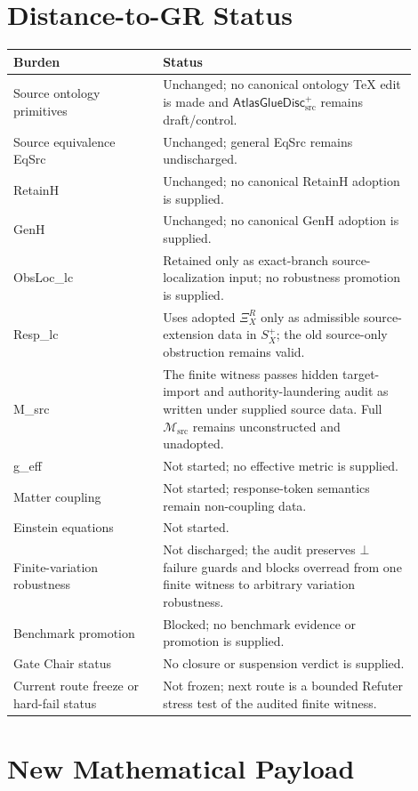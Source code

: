 \documentclass[11pt]{article}
\newcommand{\Msrc}{\mathcal{M}_{\mathrm{src}}}
\newcommand{\XiR}{\Xi_X^R}
\newcommand{\Splus}{S_X^+}
\newcommand{\AtlasGlueDisc}{\mathsf{AtlasGlueDisc}_{\mathrm{src}}^{+}}
\newcommand{\Bot}{\bot}
\begin{document}
\section{Distance-to-GR Status}

\begin{center}
\begin{tabular}{p{0.33\linewidth}p{0.57\linewidth}}
\hline
Burden & Status \\
\hline
Source ontology primitives & Unchanged; no canonical ontology TeX edit is made and \(\AtlasGlueDisc\) remains draft/control. \\
Source equivalence EqSrc & Unchanged; general EqSrc remains undischarged. \\
RetainH & Unchanged; no canonical RetainH adoption is supplied. \\
GenH & Unchanged; no canonical GenH adoption is supplied. \\
ObsLoc\_lc & Retained only as exact-branch source-localization input; no robustness promotion is supplied. \\
Resp\_lc & Uses adopted \(\XiR\) only as admissible source-extension data in \(\Splus\); the old source-only obstruction remains valid. \\
M\_src & The finite witness passes hidden target-import and authority-laundering audit as written under supplied source data. Full \(\Msrc\) remains unconstructed and unadopted. \\
g\_eff & Not started; no effective metric is supplied. \\
Matter coupling & Not started; response-token semantics remain non-coupling data. \\
Einstein equations & Not started. \\
Finite-variation robustness & Not discharged; the audit preserves \(\Bot\) failure guards and blocks overread from one finite witness to arbitrary variation robustness. \\
Benchmark promotion & Blocked; no benchmark evidence or promotion is supplied. \\
Gate Chair status & No closure or suspension verdict is supplied. \\
Current route freeze or hard-fail status & Not frozen; next route is a bounded Refuter stress test of the audited finite witness. \\
\hline
\end{tabular}
\end{center}

\section{New Mathematical Payload}
\end{document}

